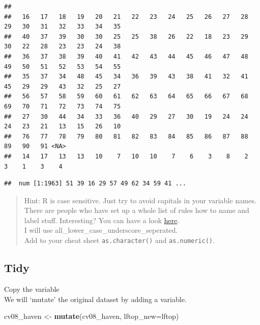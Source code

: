 \documentclass[
]{book}
\newenvironment{Shaded}{\begin{snugshade}}{\end{snugshade}}
\newcommand{\DataTypeTok}[1]{\textcolor[rgb]{0.13,0.29,0.53}{#1}}
\newcommand{\KeywordTok}[1]{\textcolor[rgb]{0.13,0.29,0.53}{\textbf{#1}}}
\newcommand{\NormalTok}[1]{#1}
\newcommand{\OperatorTok}[1]{\textcolor[rgb]{0.81,0.36,0.00}{\textbf{#1}}}
\newcommand{\StringTok}[1]{\textcolor[rgb]{0.31,0.60,0.02}{#1}}
\begin{document}
\begin{verbatim}
## 
##   16   17   18   19   20   21   22   23   24   25   26   27   28   29   30   31   32   33   34   35 
##   40   37   39   30   30   25   25   38   26   22   18   23   29   30   22   28   23   23   24   38 
##   36   37   38   39   40   41   42   43   44   45   46   47   48   49   50   51   52   53   54   55 
##   35   37   34   48   45   34   36   39   43   38   41   32   41   45   29   29   43   32   25   27 
##   56   57   58   59   60   61   62   63   64   65   66   67   68   69   70   71   72   73   74   75 
##   27   30   44   34   33   36   40   29   27   30   19   24   24   24   23   21   13   15   26   10 
##   76   77   78   79   80   81   82   83   84   85   86   87   88   89   90   91 <NA> 
##   14   17   13   13   10    7   10   10    7    6    3    8    2    3    1    3    4
\end{verbatim}

\begin{Shaded}
\end{Shaded}

\begin{verbatim}
##  num [1:1963] 51 39 16 29 57 49 62 34 59 41 ...
\end{verbatim}

\begin{quote}
Hint: R is case sensitive. Just try to avoid capitals in your variable names. There are people who have set up a whole list of rules how to name and label stuff. Interesting? You can have a look \href{https://style.tidyverse.org/}{here}.\\
I will use all\_lower\_case\_underscore\_seperated.\\
Add to your cheat sheet \texttt{as.character()} and \texttt{as.numeric()}.
\end{quote}

\hypertarget{tidy}{%
\subsection{Tidy}\label{tidy}}

Copy the variable\\
We will `mutate' the original dataset by adding a variable.

\begin{Shaded}
\begin{Highlighting}[numbers=left,,]
\NormalTok{cv08_haven <-}\StringTok{ }\KeywordTok{mutate}\NormalTok{(cv08_haven, }\DataTypeTok{lftop_new=}\NormalTok{lftop)}
\end{Highlighting}
\end{Shaded}
\end{document}
